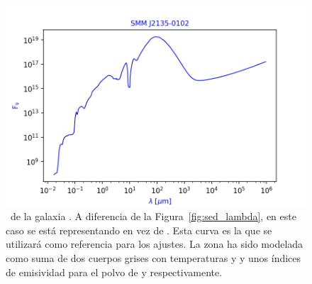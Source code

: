 \begin{figure}[htb]
    \begin{center}
         \includegraphics[width=14cm]{3_Redshift_Hatlas/grafica_SMM_F_nu.png}
    \end{center}
    \vspace{-5mm}
    \caption{\small \sed\ de la galaxia \smm. A diferencia de la Figura~\ref{fig:sed_lambda}, en este caso se está representando  en vez de . Esta curva es la que se utilizará como referencia para los ajustes. La zona  ha sido modelada como suma de dos cuerpos grises con temperaturas  y  y unos índices de emisividad para el polvo de  y  respectivamente.}
    \label{fig:sed_nu}
\end{figure}

